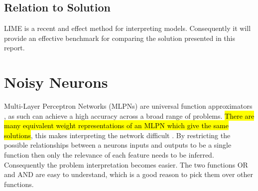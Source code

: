 \subsection{Relation to Solution}
LIME is a recent and effect method for interpreting models. Consequently it will provide an effective benchmark for comparing the solution presented in this report.

\section{Noisy Neurons} \label{sec:background-noisy-neurons}
Multi-Layer Perceptron Networks (MLPNs) are universal function approximators \cite{hornik1989multilayer}, as such can achieve a high accuracy across a broad range of problems. \hl{There are many equivalent weight representations of an MLPN which give the same solutions}, this makes interpreting the network difficult \cite{LearningLogicalActivations}. By restricting the possible relationships between a neurons inputs and outputs to be a single function then only the relevance of each feature needs to be inferred. Consequently the problem interpretation becomes easier. The two functions OR and AND are easy to understand, which is a good reason to pick them over other functions.\\


